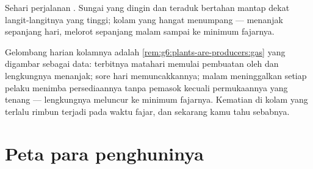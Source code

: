 \begin{omfigure}

{\small Sehari perjalanan . Sungai yang dingin dan
teraduk bertahan mantap dekat langit-langitnya yang tinggi; kolam yang
hangat menumpang  --- menanjak sepanjang hari, melorot
sepanjang malam sampai ke minimum fajarnya.}
\end{omfigure}

\begin{example}\label{ex:g7:oxygen-in-the-water:curve}
Gelombang harian kolamnya adalah
\cref{rem:g6:plants-are-producers:gas} yang digambar sebagai data:
terbitnya matahari memulai pembuatan oleh  dan lengkungnya
menanjak; sore hari memuncakkannya; malam meninggalkan setiap pelaku
 menimba persediaannya tanpa pemasok kecuali permukaannya
yang tenang --- lengkungnya meluncur ke minimum fajarnya. Kematian
 di kolam yang terlalu rimbun terjadi pada waktu fajar, dan
sekarang kamu tahu sebabnya.
\end{example}

\section{Peta para penghuninya}


